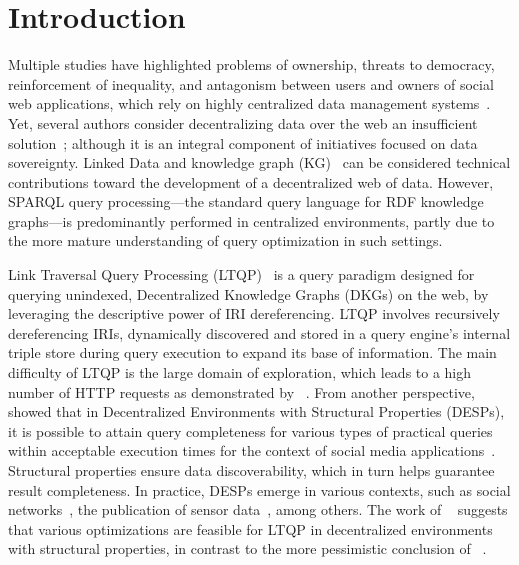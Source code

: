 \section{Introduction}

Multiple studies have highlighted problems of ownership, threats to democracy, reinforcement of inequality, and antagonism between users and owners of social web applications, which rely on highly centralized data management systems~\cite{Terranova2000FreeLP, Curran2016ch1, Sevignani2013, 9663788}.
Yet, several authors consider decentralizing data over the web an insufficient solution~\cite{9663788, Curran2016ch1}; although it is an integral component of initiatives focused on data sovereignty.
Linked Data and knowledge graph (KG)~\cite{heath2011} can be considered technical contributions toward the development of a decentralized web of data.
However, SPARQL query processing—the standard query language for RDF knowledge graphs—is predominantly performed in centralized environments, partly due to the more mature understanding of query optimization in such settings.

Link Traversal Query Processing (LTQP)~\cite{Hartig2012} is a query paradigm designed for querying unindexed, Decentralized Knowledge Graphs (DKGs) on the web, by leveraging the descriptive power of IRI dereferencing.
LTQP involves recursively dereferencing IRIs, dynamically discovered and stored in a query engine's internal triple store during query execution to expand its base of information.
The main difficulty of LTQP is the large domain of exploration, which leads to a high number of HTTP requests as demonstrated by \citeauthor{hartig2016walking}~\cite{hartig2016walking}.
From another perspective, \citeauthor{Taelman2023}~\cite{Taelman2023} showed that in Decentralized Environments with Structural Properties (DESPs), it is possible to attain query completeness for various types of practical queries within acceptable execution times for the context of social media applications~\cite{nielsen1993response}.
Structural properties ensure data discoverability, which in turn helps guarantee result completeness.
In practice, DESPs emerge in various contexts, such as social networks~\cite{Taelman2023}, the publication of sensor data~\cite{tam_iswc_traversalsensortree_2024}, among others.
The work of \citeauthor{Taelman2023}~\cite{Taelman2023} suggests that various optimizations are feasible for LTQP in decentralized environments with structural properties, in contrast to the more pessimistic conclusion of \citeauthor{hartig2016walking}~\cite{hartig2016walking}.

